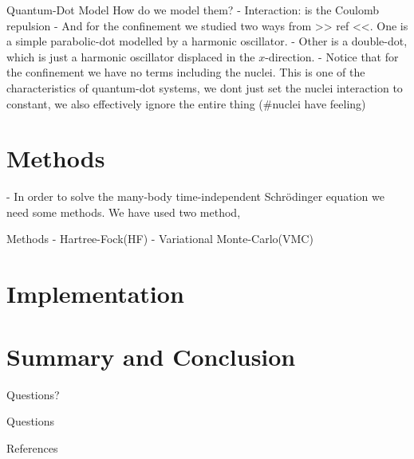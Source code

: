 \documentclass[10pt]{beamer}
\begin{document}
\begin{frame}[fragile]{Quantum-Dot Model}
    How do we model them?
        - Interaction: is the Coulomb repulsion
        - And for the confinement we studied two ways from >> ref <<. One is a simple parabolic-dot modelled by a harmonic oscillator.
        - Other is a double-dot, which is just a harmonic oscillator displaced in the $x$-direction.
        - Notice that for the confinement we have no terms including the nuclei. This is one of the characteristics of quantum-dot systems, we dont just set the nuclei interaction to constant, we also effectively ignore the entire thing (#nuclei have feeling)
\end{frame}

\section{Methods}
- In order to solve the many-body time-independent Schrödinger equation we need
some methods. We have used two method,
\begin{frame}[fragile]{Methods}
    - Hartree-Fock(HF)
    - Variational Monte-Carlo(VMC)
\end{frame}

\section{Implementation}
\section{Summary and Conclusion}

{
\begin{frame}[standout]
  Questions?
\end{frame}
}

\appendix

\begin{frame}[fragile]{Questions}
\end{frame}

\begin{frame}[allowframebreaks]{References}

  
  

\end{frame}
\end{document}
